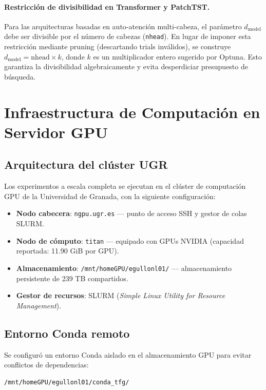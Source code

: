 \documentclass[12pt, a4paper]{article}
\newcommand{\code}[1]{\texttt{#1}}
\begin{document}
\paragraph{Restricción de divisibilidad en Transformer y PatchTST.}
Para las arquitecturas basadas en auto-atención multi-cabeza, el parámetro $d_{\text{model}}$ debe ser divisible por el número de cabezas (\code{nhead}). En lugar de imponer esta restricción mediante pruning (descartando trials inválidos), se construye $d_{\text{model}} = \text{nhead} \times k$, donde $k$ es un multiplicador entero sugerido por Optuna. Esto garantiza la divisibilidad algebraicamente y evita desperdiciar presupuesto de búsqueda.


\section{Infraestructura de Computación en Servidor GPU}
\label{sec:infraestructura}

\subsection{Arquitectura del clúster UGR}

Los experimentos a escala completa se ejecutan en el clúster de computación GPU de la Universidad de Granada, con la siguiente configuración:

\begin{itemize}
    \item \textbf{Nodo cabecera}: \code{ngpu.ugr.es} --- punto de acceso SSH y gestor de colas SLURM.
    \item \textbf{Nodo de cómputo}: \code{titan} --- equipado con GPUs NVIDIA (capacidad reportada: 11.90 GiB por GPU).
    \item \textbf{Almacenamiento}: \code{/mnt/homeGPU/egullonl01/} --- almacenamiento persistente de 239 TB compartidos.
    \item \textbf{Gestor de recursos}: SLURM (\textit{Simple Linux Utility for Resource Management}).
\end{itemize}

\subsection{Entorno Conda remoto}

Se configuró un entorno Conda aislado en el almacenamiento GPU para evitar conflictos de dependencias:
\begin{verbatim}
/mnt/homeGPU/egullonl01/conda_tfg/
\end{verbatim}
\end{document}
